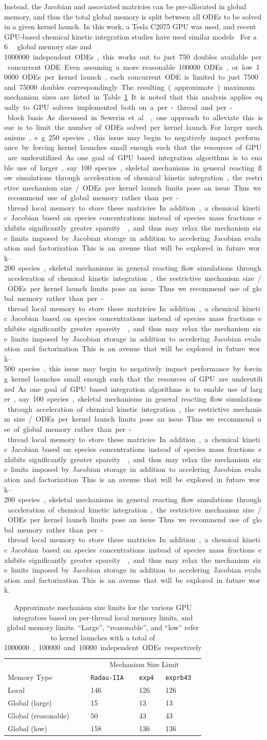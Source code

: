 \documentclass[preprint]{elsarticle}
\begin{document}
Instead, the Jacobian and associated matricies can be pre-allocated in global memory, and thus the total global memory is split between all ODEs to be solved in a given kernel launch.
In this work, a Tesla C2075 GPU was used, and recent GPU-based chemical kinetic integration studies have used similar models~\cite{Shi:2011aa,Niemeyer:2011aa,Shi:2012aa,Le2013596,Stone:2013aa,Niemeyer:2014aa}
For a \SI{6}{\giga\byte} global memory size and \SI{1000000} independent ODEs, this works out to just \SI{750} doubles available per concurrent ODE.
Even assuming a more reasonable \SI{100000} ODEs, or low \SI{10000} ODEs per kernel launch, each concurrent ODE is limited to just \SI{7500} and \SI{75000} doubles correspondingly.
The resulting (approximate) maximum mechanism sizes are listed in Table~\ref{T:size_limits}.
It is noted that this analysis applies equally to GPU solvers implemented both on a per-thread and per-block basis.
As discussed in Sewerin et al.~\cite{Sewerin20151375}, one approach to alleviate this issue is to limit the number of ODEs solved per kernel launch. 
For larger mechanisms, e.g. \SIrange{250}{500} species, this issue may begin to negatively impact performance by forcing kernel launches small enough such that the resources of GPU are underutilized.

As one goal of GPU based integration algorithms is to enable use of larger, say \SIrange{100}{200} species, skeletal mechanisms in general reacting flow simulations through acceleration of chemical kinetic integration, the restrictive mechanism size~\slash ODEs per kernel launch limits pose an issue.
Thus we recommend use of global memory rather than per-thread local memory to store these matricies.
In addition, a chemical kinetic Jacobian based on species concentrations instead of species mass fractions exhibits significantly greater sparsity~\cite{Lu:2009gh}, and thus may relax the mechanism size limits imposed by Jacobian storage in addition to accelering Jacobian evaluation and factorization.
This is an avenue that will be explored in future work.

\begin{table}[h]
\centering
\begin{tabular}{@{}l l l l@{}}
 \toprule
& \multicolumn{3}{c}{Mechanism Size Limit} \\
Memory Type & \texttt{Radau-IIA} & \texttt{exp4} & \texttt{exprb43} \\
\midrule
Local	    & 146 & 126 & 126 \\

Global (large)	    & 15 & 13 & 13 \\
Global (reasonable) & 50 & 43 & 43 \\
Global (low) & 158 & 136 & 136 \\
\bottomrule
\end{tabular}
\caption{
Approximate mechanism size limits for the various GPU integrators based on per-thread local memory limits, and global memory limits.
``Large'', ``reasonable'', and ``low'' refer to kernel launches with a total of \SI{1000000}, \SI{100000} and \SI{10000} independent ODEs respectively
}
\label{T:size_limits}
\end{table}
\end{document}
